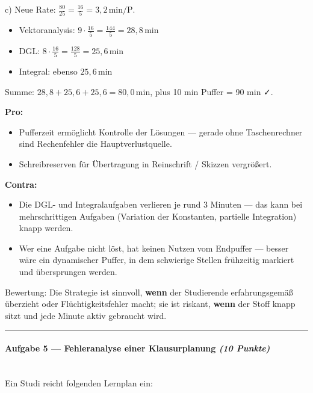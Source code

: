\documentclass[11pt, a4paper]{article}
\begin{document}
c) Neue Rate: $\frac{80}{25} = \frac{16}{5} = 3{,}2\,\text{min/P}$.


\begin{itemize}
  \item Vektoranalysis: $9 \cdot \frac{16}{5} = \frac{144}{5} = 28{,}8\,\text{min}$
  \item DGL: $8 \cdot \frac{16}{5} = \frac{128}{5} = 25{,}6\,\text{min}$
  \item Integral: ebenso $25{,}6\,\text{min}$
\end{itemize}

Summe: $28{,}8 + 25{,}6 + 25{,}6 = 80{,}0\,\text{min}$, plus 10 min Puffer = 90 min ✓.


\textbf{Pro:}

\begin{itemize}
  \item Pufferzeit ermöglicht Kontrolle der Lösungen — gerade ohne Taschenrechner sind Rechenfehler die Hauptverlustquelle.
  \item Schreibreserven für Übertragung in Reinschrift / Skizzen vergrößert.
\end{itemize}

\textbf{Contra:}

\begin{itemize}
  \item Die DGL- und Integralaufgaben verlieren je rund 3 Minuten — das kann bei mehrschrittigen Aufgaben (Variation der Konstanten, partielle Integration) knapp werden.
  \item Wer eine Aufgabe nicht löst, hat keinen Nutzen vom Endpuffer — besser wäre ein dynamischer Puffer, in dem schwierige Stellen frühzeitig markiert und übersprungen werden.
\end{itemize}

Bewertung: Die Strategie ist sinnvoll, \textbf{wenn} der Studierende erfahrungsgemäß überzieht oder Flüchtigkeitsfehler macht; sie ist riskant, \textbf{wenn} der Stoff knapp sitzt und jede Minute aktiv gebraucht wird.



\noindent\textcolor{rulegray}{\rule{\linewidth}{0.4pt}}


\paragraph{Aufgabe 5 — Fehleranalyse einer Klausurplanung \textit{(10 Punkte)}}\mbox{}\\[2pt]

Ein Studi reicht folgenden Lernplan ein:
\end{document}

